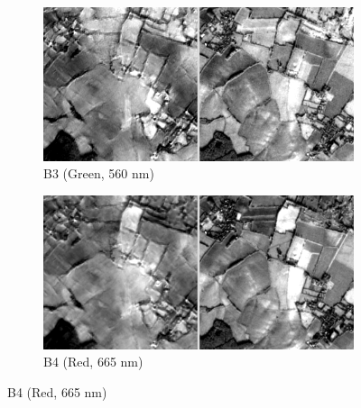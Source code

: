 \begin{figure}[h!]
    \vspace{0.5em}
    \begin{subfigure}{0.48\textwidth}
        \centering
        \includegraphics[width=\linewidth]{img/bands_gray/sample_000008_B03_panel.png}
        \caption{B3 (Green, 560 nm)}
    \end{subfigure}\hfill
    \begin{subfigure}{0.48\textwidth}
        \centering
        \includegraphics[width=\linewidth]{img/bands_gray/sample_000008_B04_panel.png}
        \caption{B4 (Red, 665 nm)}
    \end{subfigure}


\end{figure}
